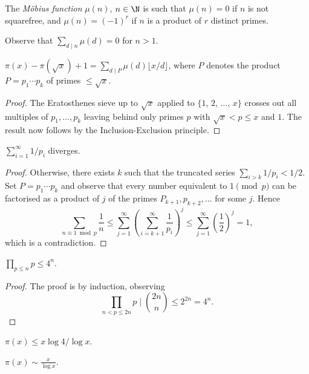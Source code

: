 \documentclass[a4paper, 10pt]{amsart}
\begin{document}
\begin{definition}
    The \emph{Möbius function} $\mu(n)$, $n \in \N$ is such that $\mu(n) = 0$ if $n$ is not squarefree, and $\mu(n) = (-1)^r$ if $n$ is a product of $r$ distinct primes. 
\end{definition}

Observe that $\sum_{d \mid n} \mu(d) = 0$ for $n> 1$.

\begin{theorem}
$\pi(x) - \pi(\sqrt{x}) + 1 = \sum_{d \mid P} \mu(d) \lfloor x/d\rfloor$, where $P$ denotes the product $P = p_1 \cdots p_k$ of primes $\leq \sqrt{x}$.
\end{theorem}
\begin{proof}
    The Eratosthenes sieve up to $\sqrt{x}$ applied to $\{1$, $2$, $\dots$, $x\}$ crosses out all multiples of $p_1, \dots, p_k$ leaving behind only primes $p$ with $\sqrt{x} < p \leq x$ and $1$. The result now follows by the Inclusion-Exclusion principle.
\end{proof}

\begin{theorem}
    $\sum_{i = 1}^{\infty} 1/p_i$ diverges.
\end{theorem}
\begin{proof}
    Otherwise, there exists $k$ such that the truncated series $\sum_{i > k} 1/p_i < 1/2$. Set $P = p_1 \cdots p_k$ and observe that every number equivalent to $1\pmod{p}$ can be factorised as a product of $j$ of the primes $P_{k+1}, p_{k+2}, \dots$ for some $j$. Hence
    $$
    \sum_{n \equiv 1 \bmod{p}} \frac{1}{n} \leq \sum_{j = 1}^{\infty} \left(\sum_{i = k + 1}^{\infty} \frac{1}{p_i}\right)^j \leq \sum_{j = 1}^{\infty} \left(\frac{1}{2}\right)^j = 1,
$$
which is a contradiction.
\end{proof}


\begin{theorem}
    $\prod_{p \leq n} p \leq 4^n$.
\end{theorem}
\begin{proof}
The proof is by induction, observing 
$$
\prod_{n < p \leq 2n} p \mid \binom{2n}{n} \leq 2^{2n} = 4^n.
$$
\end{proof}

\begin{corollary}
    $\pi(x) \leq x \log 4/\log x$.
\end{corollary}

\begin{theorem}
$\pi(x) \sim \frac{x}{\log x}$.
\end{theorem}
\end{document}
